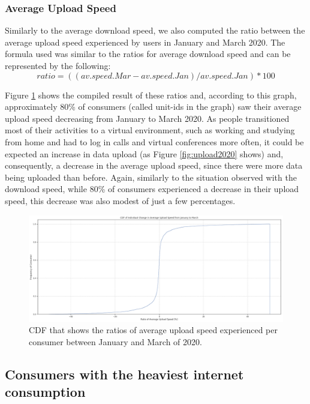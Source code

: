 \documentclass[conference,10pt]{IEEEtran}
\begin{document}
\subsubsection{Average Upload Speed}
\label{sec:average-upload-speed}
Similarly to the average download speed, we also computed the ratio between the average upload speed experienced by users in January and March 2020. The formula used was similar to the ratios for average download speed and can be represented by the following:
\begin{equation}
ratio= ((av.speed.Mar - av.speed.Jan)/ av.speed.Jan)*100
\end{equation}

Figure \ref{fig:uploadspeed2020} shows the compiled result of these ratios and, according to this graph, approximately 80\% of consumers (called unit-ids in the graph) saw their average upload speed decreasing from January to March 2020. As people transitioned most of their activities to a virtual environment, such as working and studying from home and had to log in calls and virtual conferences more often, it could be expected an increase in data upload (as Figure \ref{fig:upload2020} shows) and, consequently, a decrease in the average upload speed, since there were more data being uploaded than before. Again, similarly to the situation observed with the download speed, while 80\% of consumers experienced a decrease in their upload speed, this decrease was also modest of just a few percentages.

\begin{figure}
\centering
\includegraphics[width=1.0\linewidth]{figs/uploadspeed.PNG}
\caption{CDF that shows the ratios of average upload speed experienced per consumer between January and March of 2020.}
\label{fig:uploadspeed2020}
\end{figure}

\subsection{Consumers with the heaviest internet consumption}
\label{sec:analyzing-the-users-with-the-highest-internet-usage}
\end{document}
